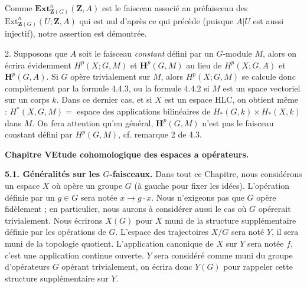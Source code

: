 \clearpage
{}

Comme $\mathbf{Ext}_{\mathbf Z(G)}^n(\mathbf Z,A)$ est le faisceau associé au
préfaisceau des $\mathrm{Ext}_{\mathbf Z(G)}^n(U;\mathbf Z,A)$ qui est nul
d'après ce qui précède (puisque $A|U$ est aussi injectif), notre assertion est
démontrée.

2. Supposons que $A$ soit le faisceau \textit{constant} défini par un
$G$-module $M$, alors on écrira évidemment $H^p(X;G,M)$ et
$\mathbf H^p(G,M)$ au lieu de $H^p(X;G,A)$ et $\mathbf H^p(G,A)$. Si $G$
opère trivialement sur $M$, alors $H^p(X;G,M)$ se calcule donc complètement
par la formule 4.4.3, ou la formule 4.4.2 si $M$ est un space vectoriel sur
un corps $k$. Dans ce dernier cas, et si $X$ est un espace HLC, on obtient
même :
$H^*(X,G,M)=$ espace des applications bilinéaires de
$H_*(G,k)\times H_*(X,k)$ dans $M$.
On fera attention qu'en général, $\mathbf H^p(G,M)$ n'est pas le faisceau
constant défini par $H^p(G,M)$, cf. remarque 2 de 4.3.

\bigskip
\begin{center}
{\large\bfseries Chapitre V\quad Etude cohomologique des espaces a
opérateurs.}
\end{center}

\textbf{5.1. Généralités sur les $G$-faisceaux.}
Dans tout ce Chapitre, nous considérons un espace $X$ où opère un groupe $G$
(à gauche pour fixer les idées). L'opération définie par un $g\in G$ sera
notée $x\to g\mathbin{\cdot}x$. Nous n'exigeons pas que $G$ opère
fidèlement ; en particulier, nous aurons à considérer aussi le cas où $G$
opérerait trivialement. Nous écrirons $X(G)$ pour $X$ muni de la structure
supplémentaire définie par les opérations de $G$. L'espace des trajectoires
$X/G$ sera noté $Y$, il sera muni de la topologie quotient. L'application
canonique de $X$ sur $Y$ sera notée $f$, c'est une application continue
ouverte. $Y$ sera considéré comme muni du groupe d'opérateurs $G$ opérant
trivialement, on écrira donc $Y(G)$ pour rappeler cette structure
supplémentaire sur $Y$.

